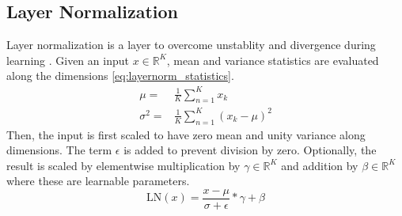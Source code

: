 \subsection{Layer Normalization}
Layer normalization is a layer to overcome unstablity and divergence during learning \cite{ba_layer_2016}. Given an input $x \in \mathbb{R}^K$, mean and variance statistics are evaluated along the dimensions \eqref{eq:layernorm_statistics}. \\
\begin{equation}
\label{eq:layernorm_statistics}
\begin{split}
\mu = & \frac{1}{K} \sum_{n=1}^{K} x_k \\
\sigma^2 = & \frac{1}{K} \sum_{n=1}^{K} (x_k-\mu)^2
\end{split}
\end{equation} 
Then, the input is first scaled to have zero mean and unity variance along dimensions. The term $\epsilon$ is added to prevent division by zero. Optionally, the result is scaled by elementwise multiplication by $\gamma \in \mathbb{R}^K$ and addition by $\beta \in \mathbb{R}^K$ where these are learnable parameters. \\
\begin{equation}
\label{eqn:layernorm}
\mathrm{LN}(x) = \frac{x-\mu}{\sigma+\epsilon} * \gamma + \beta
\end{equation}
